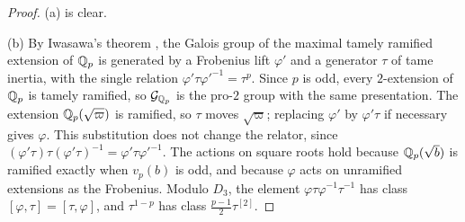 \begin{proof}
(a) is clear.

(b) By Iwasawa's theorem \cite[Theorem~7.5.3]{NeukirchSchmidtWingberg2008},
the Galois group of the maximal tamely ramified extension of $\mathbb Q_p$ is
generated by a Frobenius lift $\varphi'$ and a generator $\tau$ of tame
inertia, with the single relation $\varphi'\tau\varphi'^{-1}=\tau^p$. Since
$p$ is odd,
every $2$-extension of $\mathbb Q_p$ is tamely ramified, so $\mathcal G_{\mathbb Q_p}$ is
the pro-$2$ group with the same presentation. The extension
$\mathbb Q_p(\sqrt\varpi)$ is ramified, so $\tau$ moves $\sqrt\varpi$; replacing
$\varphi'$ by $\varphi'\tau$ if necessary gives $\varphi$. This substitution
does not change the relator, since
$(\varphi'\tau)\tau(\varphi'\tau)^{-1}=\varphi'\tau\varphi'^{-1}$.
The actions on square roots hold because $\mathbb Q_p(\sqrt b)$ is ramified exactly
when $v_p(b)$ is odd, and because $\varphi$ acts on unramified extensions as
the Frobenius. Modulo $D_3$, the element $\varphi\tau\varphi^{-1}\tau^{-1}$
has class $[\varphi,\tau]=[\tau,\varphi]$, and $\tau^{1-p}$ has class
$\frac{p-1}2\tau^{[2]}$.


\end{proof}
